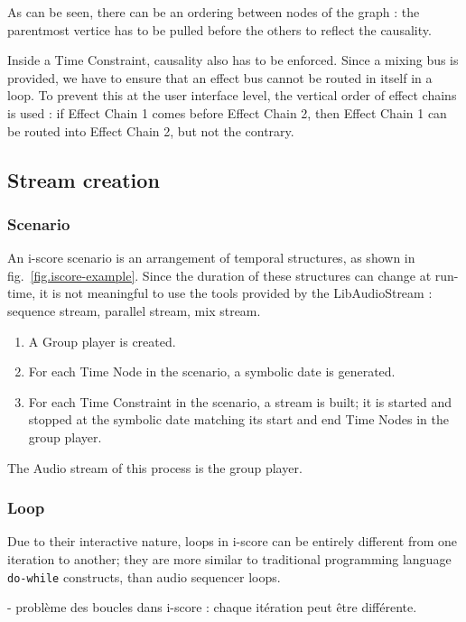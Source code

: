 \documentclass{article}
\begin{document}
As can be seen, there can be an ordering between nodes of the graph : the parentmost vertice
has to be pulled before the others to reflect the causality.

Inside a Time Constraint, causality also has to be enforced. 
Since a mixing bus is provided, we have to ensure that an effect bus cannot be routed in 
itself in a loop. 
To prevent this at the user interface level, the vertical order of effect chains is used : 
if Effect Chain 1 comes before Effect Chain 2, then Effect Chain 1 can be routed into Effect Chain 2, but not the contrary.

\subsection{Stream creation}
\subsubsection{Scenario}
An i-score scenario is an arrangement of temporal structures, as shown in fig.~\ref{fig.iscore-example}.
Since the duration of these structures can change at run-time, it is not meaningful to use the tools provided by the LibAudioStream : sequence stream, parallel stream, mix stream.

\begin{enumerate}
	\item A Group player is created.
	\item For each Time Node in the scenario, a symbolic date is generated.
	\item For each Time Constraint in the scenario, a stream is built; it is started and stopped at the symbolic date matching its start and end Time Nodes in the group player.
\end{enumerate}

The Audio stream of this process is the group player.

\subsubsection{Loop}
Due to their interactive nature, loops in i-score can be entirely different from 
one iteration to another; they are more similar to traditional programming language \texttt{do-while} constructs, than audio sequencer loops.

- problème des boucles dans i-score : chaque itération peut être différente.
\end{document}
